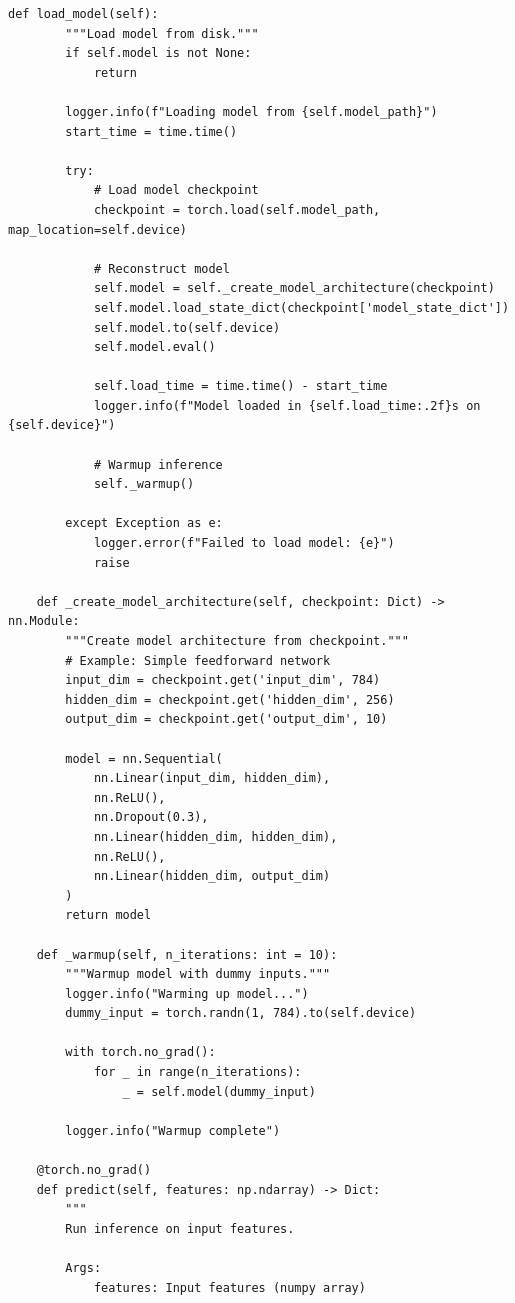 \begin{lstlisting}[style=python, caption=Production-ready FastAPI model serving]
    def load_model(self):
        """Load model from disk."""
        if self.model is not None:
            return

        logger.info(f"Loading model from {self.model_path}")
        start_time = time.time()

        try:
            # Load model checkpoint
            checkpoint = torch.load(self.model_path, map_location=self.device)

            # Reconstruct model
            self.model = self._create_model_architecture(checkpoint)
            self.model.load_state_dict(checkpoint['model_state_dict'])
            self.model.to(self.device)
            self.model.eval()

            self.load_time = time.time() - start_time
            logger.info(f"Model loaded in {self.load_time:.2f}s on {self.device}")

            # Warmup inference
            self._warmup()

        except Exception as e:
            logger.error(f"Failed to load model: {e}")
            raise

    def _create_model_architecture(self, checkpoint: Dict) -> nn.Module:
        """Create model architecture from checkpoint."""
        # Example: Simple feedforward network
        input_dim = checkpoint.get('input_dim', 784)
        hidden_dim = checkpoint.get('hidden_dim', 256)
        output_dim = checkpoint.get('output_dim', 10)

        model = nn.Sequential(
            nn.Linear(input_dim, hidden_dim),
            nn.ReLU(),
            nn.Dropout(0.3),
            nn.Linear(hidden_dim, hidden_dim),
            nn.ReLU(),
            nn.Linear(hidden_dim, output_dim)
        )
        return model

    def _warmup(self, n_iterations: int = 10):
        """Warmup model with dummy inputs."""
        logger.info("Warming up model...")
        dummy_input = torch.randn(1, 784).to(self.device)

        with torch.no_grad():
            for _ in range(n_iterations):
                _ = self.model(dummy_input)

        logger.info("Warmup complete")

    @torch.no_grad()
    def predict(self, features: np.ndarray) -> Dict:
        """
        Run inference on input features.

        Args:
            features: Input features (numpy array)


\end{lstlisting}
